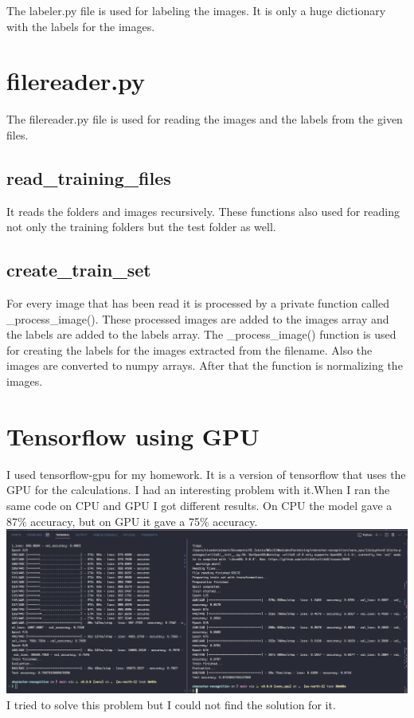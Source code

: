 \documentclass[11pt,a4paper,oneside]{report}
\begin{document}
The labeler.py file is used for labeling the images. It is only a huge dictionary with the labels for the images.

\section{filereader.py}

The filereader.py file is used for reading the images and the labels from the given files.
\subsection{read\_training\_files}
It reads the folders and images recursively.
These functions also used for reading not only the training folders but the test folder as well.

\subsection{create\_train\_set}
For every image that has been read it is processed by a private function called \_process\_image().
These processed images are added to the images array and the labels are added to the labels array.
The \_process\_image() function is used for creating the labels for the images extracted from the filename.
Also the images are converted to numpy arrays.
After that the function is normalizing the images.

\section{Tensorflow using GPU}

I used tensorflow-gpu for my homework.
It is a version of tensorflow that uses the GPU for the calculations. I had an interesting problem with it.When I ran the same code on CPU and GPU I got different results.
On CPU the model gave a 87\% accuracy, but on GPU it gave a 75\% accuracy.
\includegraphics[width=\textwidth]{cpuvsgpu}
I tried to solve this problem but I could not find the solution for it.
\end{document}
